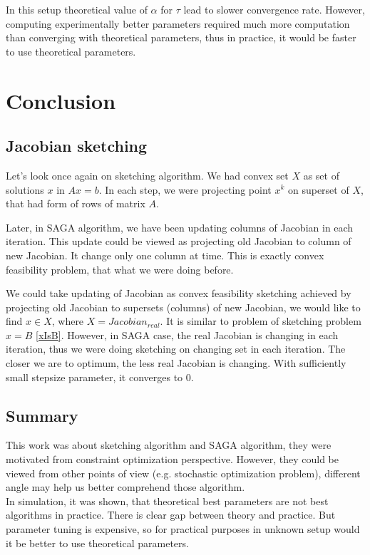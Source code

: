 \documentclass[11pt]{book}
\begin{document}
In this setup theoretical value of $\alpha$ for $\tau$ lead to slower convergence rate. However, computing experimentally better parameters required much more computation than converging with theoretical parameters, thus in practice, it would be faster to use theoretical parameters.

\chapter{Conclusion}

\section{Jacobian sketching}

Let's look once again on sketching algorithm. We had convex set $X$ as set of solutions $x$ in $Ax=b$. In each step, we were projecting point $x^k$ on superset of $X$, that had form of rows of matrix $A$.

Later, in SAGA algorithm, we have been updating columns of Jacobian in each iteration. This update could be viewed as projecting old Jacobian to column of new Jacobian. It change only one column at time. This is exactly convex feasibility problem, that what we were doing before.

We could take updating of Jacobian as convex feasibility sketching achieved by projecting old Jacobian to supersets (columns) of new Jacobian, we would like to find $x \in X$, where $X=Jacobian_{real}$. It is similar to problem of sketching problem $x=B$ \ref{xIsB}. However, in SAGA case, the real Jacobian is changing in each iteration, thus we were doing sketching on changing set in each iteration. The closer we are to optimum, the less real Jacobian is changing. With sufficiently small stepsize parameter, it converges to $0$.


\section{Summary}
This work was about sketching algorithm and SAGA algorithm, they were motivated from constraint optimization perspective. However, they could be viewed from other points of view (e.g. stochastic optimization problem), different angle may help us better comprehend those algorithm.\\

In simulation, it was shown, that theoretical best parameters are not best algorithms in practice. There is clear gap between theory and practice. But parameter tuning is expensive, so for practical purposes in unknown setup would it be better to use theoretical parameters.
\end{document}
